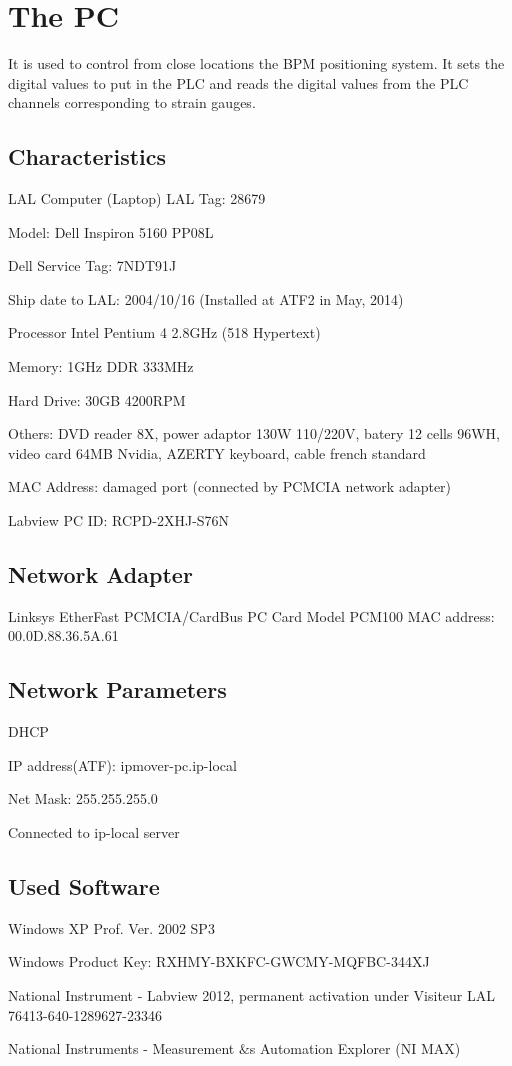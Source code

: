 \section{The PC}
It is used to control from close locations the BPM positioning system. It sets the digital values to put in the PLC and reads the digital values from the PLC channels corresponding to strain gauges.\par
\subsection{Characteristics}
LAL Computer (Laptop)
LAL Tag: 28679\par
Model: Dell Inspiron 5160 PP08L\par
Dell Service Tag: 7NDT91J\par
Ship date to LAL: 2004/10/16 (Installed at ATF2 in May, 2014)\par
Processor Intel Pentium 4 2.8GHz (518 Hypertext)\par
Memory: 1GHz DDR 333MHz\par
Hard Drive: 30GB 4200RPM\par
Others: DVD reader 8X, power adaptor 130W 110/220V, batery 12 cells 96WH, video card 64MB Nvidia, AZERTY keyboard, cable french standard\par
MAC Address: damaged port (connected by PCMCIA network adapter)\par
Labview PC ID: RCPD-2XHJ-S76N

\subsection{Network Adapter}
Linksys EtherFast PCMCIA/CardBus PC Card Model PCM100
MAC address: 00.0D.88.36.5A.61

\subsection{Network Parameters}
DHCP\par
IP address(ATF): ipmover-pc.ip-local\par
Net Mask: 255.255.255.0\par
Connected to ip-local server\par

\subsection{Used Software}
Windows XP Prof. Ver. 2002 SP3\par
Windows Product Key: RXHMY-BXKFC-GWCMY-MQFBC-344XJ\par
\par
National Instrument - Labview 2012, permanent activation under Visiteur LAL 76413-640-1289627-23346\par
National Instruments - Measurement $\&$s Automation Explorer (NI MAX)\par

